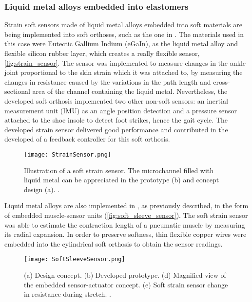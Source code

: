 \subsubsection{Liquid metal alloys embedded into elastomers}

Strain soft sensors made of liquid metal alloys embedded into soft materials are being implemented into soft orthoses, such as the one in \cite{park2011bio}. The materials used in this case were Eutectic Gallium Indium (eGaIn), as the liquid metal alloy and flexible silicon rubber layer, which creates a really flexible sensor, \autoref{fig:strain_sensor}. The sensor was implemented to measure changes in the ankle joint proportional to the skin strain which it was attached to, by measuring the changes in resistance caused by the variations in the path length and cross-sectional area of the channel containing the liquid metal. Nevertheless, the developed soft orthosis implemented two other non-soft sensors: an inertial measurement unit (IMU) as an angle position detection and a pressure sensor attached to the shoe insole to detect foot strikes, hence the gait cycle. The developed strain sensor delivered good performance and contributed in the developed of a feedback controller for this soft orthosis.

\begin{figure}[hbtp!]
    \centering
    \texttt{[image: StrainSensor.png]}
    \caption{Illustration of a soft strain sensor. The microchannel filled with liquid metal can be appreciated in the prototype (b) and concept design (a). \cite{park2011bio}. }
    \label{fig:strain_sensor}
\end{figure}

Liquid metal alloys are also implemented in \cite{Park2012}, as previously described, in the form of embedded muscle-sensor units (\autoref{fig:soft_sleeve_sensor}). The soft strain sensor was able to estimate the contraction length of a pneumatic muscle by measuring its radial expansion. In order to preserve softness, thin flexible copper wires were embedded into the cylindrical soft orthosis to obtain the sensor readings.

\begin{figure}[hbtp!]
    \centering
    \texttt{[image: SoftSleeveSensor.png]}
    \caption{(a) Design concept. (b) Developed prototype. (d) Magnified view of the embedded sensor-actuator concept. (e) Soft strain sensor change in resistance during stretch. \cite{Park2012}. }
    \label{fig:soft_sleeve_sensor}
\end{figure}

